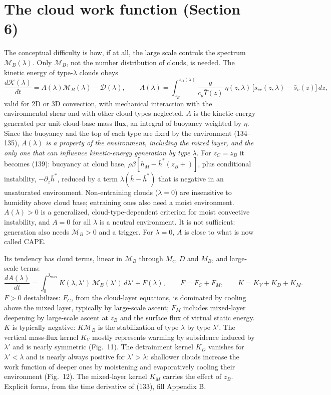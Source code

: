 \documentclass[10pt,a4paper]{article}
\newcommand{\MB}{\mathcal M_B}
\begin{document}
\section{The cloud work function (Section 6)}
The conceptual difficulty is how, if at all, the large scale controls the spectrum $\MB(\lambda)$. Only $\MB$, not the number distribution of clouds, is needed. The kinetic energy of type-$\lambda$ clouds obeys
\[
\frac{d\mathcal K(\lambda)}{dt}=A(\lambda)\MB(\lambda)-\mathcal D(\lambda),\qquad
A(\lambda)=\int_{z_B}^{z_D(\lambda)}\frac{g}{c_p\bar T(z)}\,\eta(z,\lambda)\,\big[s_{vc}(z,\lambda)-\bar s_v(z)\big]\,dz ,
\]
valid for 2D or 3D convection, with mechanical interaction with the environmental shear and with other cloud types neglected. $A$ is the kinetic energy generated per unit cloud-base mass flux, an integral of buoyancy weighted by $\eta$. Since the buoyancy and the top of each type are fixed by the environment (134--135), \emph{$A(\lambda)$ is a property of the environment, including the mixed layer, and the only one that can influence kinetic-energy generation by type $\lambda$}. For $z_C=z_B$ it becomes (139): buoyancy at cloud base, $\rho\beta[h_M-\bar h^*(z_B+)]$, plus conditional instability, $-\partial_z\bar h^*$, reduced by a term $\lambda(\bar h-\bar h^*)$ that is negative in an unsaturated environment. Non-entraining clouds ($\lambda=0$) are insensitive to humidity above cloud base; entraining ones also need a moist environment. $A(\lambda)>0$ is a generalized, cloud-type-dependent criterion for moist convective instability, and $A=0$ for all $\lambda$ is a neutral environment. It is not sufficient: generation also needs $\MB>0$ and a trigger. \ours{} For $\lambda=0$, $A$ is close to what is now called CAPE.

Its tendency has cloud terms, linear in $\MB$ through $M_c$, $D$ and $M_B$, and large-scale terms:
\[
\frac{dA(\lambda)}{dt}=\int_0^{\lambda_{\max}}K(\lambda,\lambda')\,\MB(\lambda')\,d\lambda'+F(\lambda),\qquad F=F_C+F_M,\qquad K=K_V+K_D+K_M .
\]
$F>0$ destabilizes: $F_C$, from the cloud-layer equations, is dominated by cooling above the mixed layer, typically by large-scale ascent; $F_M$ includes mixed-layer deepening by large-scale ascent at $z_B$ and the surface flux of virtual static energy. $K$ is typically negative: $K\MB$ is the stabilization of type $\lambda$ by type $\lambda'$. The vertical mass-flux kernel $K_V$ mostly represents warming by subsidence induced by $\lambda'$ and is nearly symmetric (Fig.\ 11). The detrainment kernel $K_D$ vanishes for $\lambda'<\lambda$ and is nearly always positive for $\lambda'>\lambda$: shallower clouds increase the work function of deeper ones by moistening and evaporatively cooling their environment (Fig.\ 12). The mixed-layer kernel $K_M$ carries the effect of $z_B$. Explicit forms, from the time derivative of (133), fill Appendix B.
\end{document}
